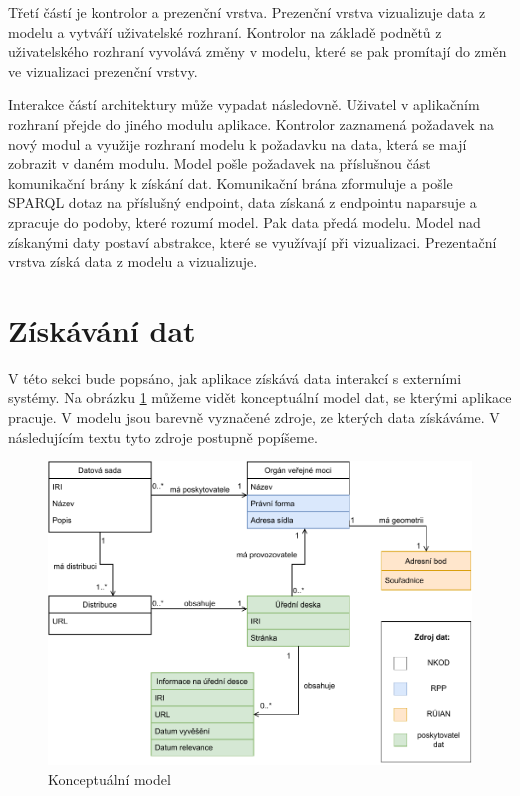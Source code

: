 Třetí částí je kontrolor a prezenční vrstva. Prezenční vrstva vizualizuje data z modelu a vytváří uživatelské rozhraní. Kontrolor na základě podnětů z uživatelského rozhraní vyvolává změny v modelu, které se pak promítají do změn ve vizualizaci prezenční vrstvy. 

Interakce částí architektury může vypadat následovně. Uživatel v aplikačním rozhraní přejde do jiného modulu aplikace. Kontrolor zaznamená požadavek na nový modul a využije rozhraní modelu k požadavku na data, která se mají zobrazit v daném modulu. Model pošle požadavek na příslušnou část komunikační brány k získání dat. Komunikační brána zformuluje a pošle SPARQL dotaz na příslušný endpoint, data získaná z endpointu naparsuje a zpracuje do podoby, které rozumí model. Pak data předá modelu. Model nad získanými daty postaví abstrakce, které se využívají při vizualizaci. Prezentační vrstva získá data z modelu a vizualizuje.

\section{Získávání dat}\label{sec:ziskavani-dat}

V této sekci bude popsáno, jak aplikace získává data interakcí s externími systémy. Na obrázku \ref{fig:konc-model} můžeme vidět konceptuální model dat, se kterými aplikace pracuje. V modelu jsou barevně vyznačené zdroje, ze kterých data získáváme. V následujícím textu tyto zdroje postupně popíšeme.

\begin{figure} 
\includegraphics[width=\textwidth]{cs/obrazky/konceptualni_model.pdf}
\caption{Konceptuální model}
\label{fig:konc-model}
\end{figure}

